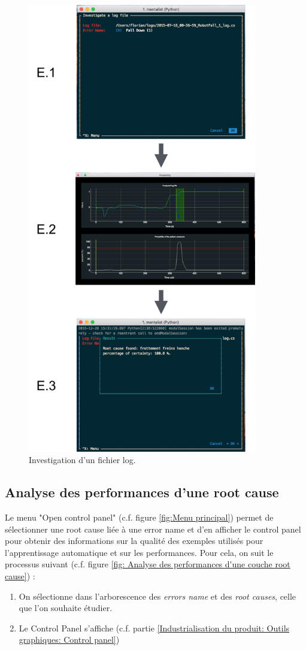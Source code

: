 \begin{figure}[H]
	\centering\includegraphics[width=10cm]{images/invest_menu.png}
	\caption[Investigation d'un fichier log]{Investigation d'un fichier log.}
	\label{fig: Investigation d'un fichier log}
\end{figure} 

\subsection{Analyse des performances d'une  root cause}
\label{Industrialisation du produit: Utilisation suggérée des outils: Analyse des performances d'une  root cause}
Le menu "Open control panel" (c.f. figure \ref{fig:Menu principal}) permet de sélectionner une root cause liée à une error name et d'en afficher le control panel pour obtenir des informations sur la qualité des exemples utilisés pour l'apprentissage automatique et sur les performances. Pour cela, on suit le processus suivant (c.f. figure \ref{fig: Analyse des performances d'une couche root cause}) : 
\begin{enumerate}
	\item On sélectionne dans l'arborescence des \emph{errors name} et des\emph{ root causes}, celle que l'on souhaite étudier.
	\item Le Control Panel s'affiche (c.f. partie \ref{Industrialisation du produit: Outils graphiques: Control panel})
\end{enumerate}

